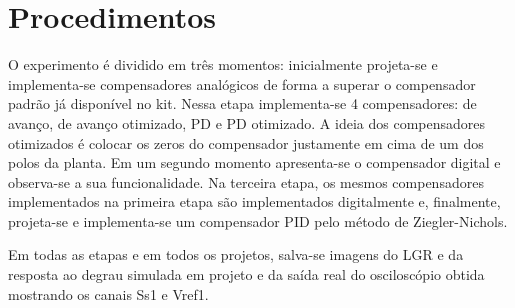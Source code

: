\section{Procedimentos}
O experimento é dividido em três momentos: inicialmente projeta-se e implementa-se compensadores analógicos de forma a superar o compensador padrão já disponível no kit. Nessa etapa implementa-se 4 compensadores: de avanço, de avanço otimizado, PD e PD otimizado. A ideia dos compensadores otimizados é colocar os zeros do compensador justamente em cima de um dos polos da planta. Em um segundo momento apresenta-se o compensador digital e observa-se a sua funcionalidade. Na terceira etapa, os mesmos compensadores implementados na primeira etapa são implementados digitalmente e, finalmente, projeta-se e implementa-se um compensador PID pelo método de Ziegler-Nichols.

Em todas as etapas e em todos os projetos, salva-se imagens do LGR e da resposta ao degrau simulada em projeto e da saída real do osciloscópio obtida mostrando os canais Ss1 e Vref1.
